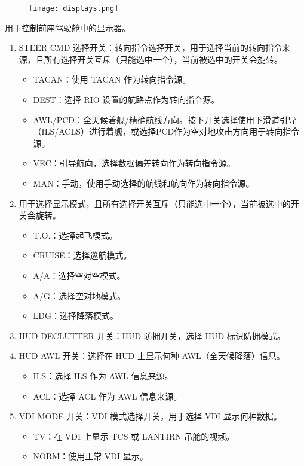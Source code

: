 \begin{figure}[htb]
	\centering
	\texttt{[image: displays.png]}
\end{figure}
用于控制前座驾驶舱中的显示器。

\begin{enumerate}
	\item STEER CMD 选择开关：转向指令选择开关，用于选择当前的转向指令来源，且所有选择开关互斥（只能选中一个），当前被选中的开关会旋转。
	      \begin{itemize}
		      \item TACAN：使用 TACAN 作为转向指令源。
		      \item DEST：选择 RIO 设置的航路点作为转向指令源。
		      \item AWL/PCD：全天候着舰/精确航线方向。按下开关选择使用下滑道引导（ILS/ACLS）进行着舰，或选择PCD作为空对地攻击方向用于转向指令源。
		      \item VEC：引导航向，选择数据偏差转向作为转向指令源。
		      \item MAN：手动，使用手动选择的航线和航向作为转向指令源。
	      \end{itemize}
	\item 用于选择显示模式，且所有选择开关互斥（只能选中一个），当前被选中的开关会旋转。
	      \begin{itemize}
		      \item T.O.：选择起飞模式。
		      \item CRUISE：选择巡航模式。
		      \item A/A：选择空对空模式。
		      \item A/G：选择空对地模式。
		      \item LDG：选择降落模式。
	      \end{itemize}
	\item HUD DECLUTTER 开关：HUD 防拥开关，选择 HUD 标识防拥模式。
	\item HUD AWL 开关：选择在 HUD 上显示何种 AWL（全天候降落）信息。
	      \begin{itemize}
		      \item ILS：选择 ILS 作为 AWL 信息来源。
		      \item ACL：选择 ACL 作为 AWL 信息来源。
	      \end{itemize}
	\item VDI MODE 开关：VDI 模式选择开关，用于选择 VDI 显示何种数据。
	      \begin{itemize}
		      \item TV：在 VDI 上显示 TCS 或 LANTIRN 吊舱的视频。
		      \item NORM：使用正常 VDI 显示。

\end{itemize}
\end{enumerate}
